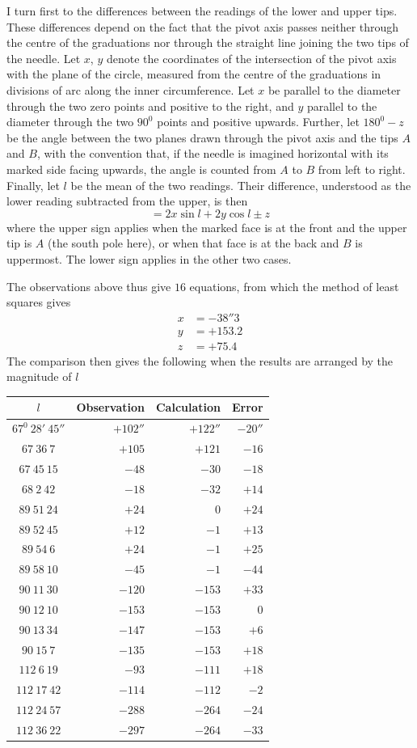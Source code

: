 I turn first to the differences between the readings of the lower and upper tips. These differences depend on the fact that the pivot axis passes neither through the centre of the graduations nor through the straight line joining the two tips of the needle. Let $x$, $y$ denote the coordinates of the intersection of the pivot axis with the plane of the circle, measured from the centre of the graduations in divisions of arc along the inner circumference. Let $x$ be parallel to the diameter through the two zero points and positive to the right, and $y$ parallel to the diameter through the two $90^0$ points and positive upwards. Further, let $180^0-z$ be the angle between the two planes drawn through the pivot axis and the tips $A$ and $B$, with the convention that, if the needle is imagined horizontal with its marked side facing upwards, the angle is counted from $A$ to $B$ from left to right. Finally, let $l$ be the mean of the two readings. Their difference, understood as the lower reading subtracted from the upper, is then
\[
=2x\sin l+2y\cos l\pm z
\]
where the upper sign applies when the marked face is at the front and the upper tip is $A$ (the south pole here), or when that face is at the back and $B$ is uppermost. The lower sign applies in the other two cases.

The observations above thus give $16$ equations, from which the method of least squares gives
\[
\begin{aligned}
x&=-38''3\\
y&=+153.2\\
z&=+75.4
\end{aligned}
\]
The comparison then gives the following when the results are arranged by the magnitude of $l$
\begin{center}
{\fontsize{9}{11}\selectfont
\begin{tabular}{c|r|r|r}
$l$&Observation&Calculation&Error\\\hline
$67^0\ 28'\ 45''$&$+102''$&$+122''$&$-20''$\\
$67\ 36\ 7$&$+105$&$+121$&$-16$\\
$67\ 45\ 15$&$-48$&$-30$&$-18$\\
$68\ 2\ 42$&$-18$&$-32$&$+14$\\
$89\ 51\ 24$&$+24$&$0$&$+24$\\
$89\ 52\ 45$&$+12$&$-1$&$+13$\\
$89\ 54\ 6$&$+24$&$-1$&$+25$\\
$89\ 58\ 10$&$-45$&$-1$&$-44$\\
$90\ 11\ 30$&$-120$&$-153$&$+33$\\
$90\ 12\ 10$&$-153$&$-153$&$0$\\
$90\ 13\ 34$&$-147$&$-153$&$+6$\\
$90\ 15\ 7$&$-135$&$-153$&$+18$\\
$112\ 6\ 19$&$-93$&$-111$&$+18$\\
$112\ 17\ 42$&$-114$&$-112$&$-2$\\
$112\ 24\ 57$&$-288$&$-264$&$-24$\\
$112\ 36\ 22$&$-297$&$-264$&$-33$
\end{tabular}}
\end{center}


